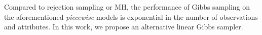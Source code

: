Compared to rejection sampling or MH, the performance of Gibbs sampling on the aforementioned \emph{piecewise} models is exponential in the number of observations and attributes.  
In this work, we propose an alternative linear Gibbs sampler. %


